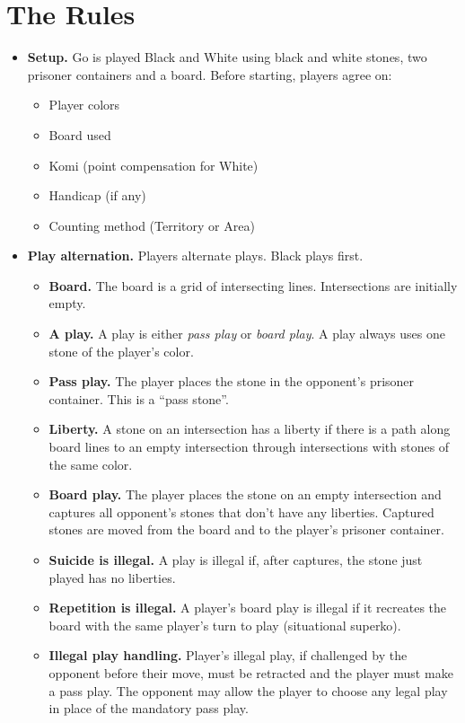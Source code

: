 \documentclass[11pt]{article}
\begin{document}
\newpage
\section{The Rules}

\begin{itemize}
\item \textbf{Setup.} Go is played Black and White using black and white stones, two prisoner containers and a board.
Before starting, players agree on:
    \begin{itemize}
    \item Player colors
    \item Board used
    \item Komi (point compensation for White)
    \item Handicap (if any)
    \item Counting method (Territory or Area)
    \end{itemize}

\item \textbf{Play alternation.} Players alternate plays.
Black plays first.
    \begin{itemize}
    \item \textbf{Board.} The board is a grid of intersecting lines.
    Intersections are initially empty.
    \item \textbf{A play.} A play is either \textit{pass play} or \textit{board play}.
    A play always uses one stone of the player's color.
    \item \textbf{Pass play.} The player places the stone in the opponent's prisoner container.
    This is a ``pass stone''.
    \item \textbf{Liberty.} A stone on an intersection has a liberty if there is a path along board lines to an empty intersection through intersections with stones of the same color.
    \item \textbf{Board play.} The player places the stone on an empty intersection and captures all opponent's stones that don't have any liberties.
    Captured stones are moved from the board and to the player's prisoner container.
    \item \textbf{Suicide is illegal.} A play is illegal if, after captures, the stone just played has no liberties.
    \item \textbf{Repetition is illegal.} A player's board play is illegal if it recreates the board with the same player's turn to play (situational superko).
    \item \textbf{Illegal play handling.} Player's illegal play, if challenged by the opponent before their move, must be retracted and the player must make a pass play.
    The opponent may allow the player to choose any legal play in place of the mandatory pass play.
    \end{itemize}


\end{itemize}
\end{document}
